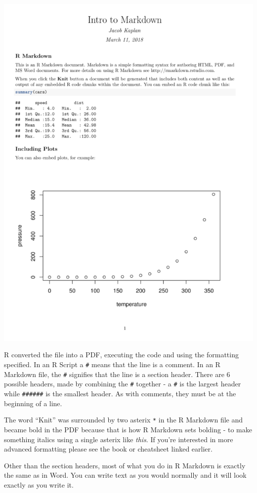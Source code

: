 \documentclass[
  12pt,
]{book}
\begin{document}
\includegraphics{images/markdown_output_example.PNG}

R converted the file into a PDF, executing the code and using the formatting specified. In an R Script a \texttt{\#} means that the line is a comment. In an R Markdown file, the \texttt{\#} signifies that the line is a section header. There are 6 possible headers, made by combining the \texttt{\#} together - a \texttt{\#} is the largest header while \texttt{\#\#\#\#\#\#} is the smallest header. As with comments, they must be at the beginning of a line.

The word ``Knit'' was surrounded by two asterix \texttt{*} in the R Markdown file and became bold in the PDF because that is how R Markdown sets bolding - to make something italics using a single asterix like \emph{this}. If you're interested in more advanced formatting please see the book or cheatsheet linked earlier.

Other than the section headers, most of what you do in R Markdown is exactly the same as in Word. You can write text as you would normally and it will look exactly as you write it.
\end{document}
